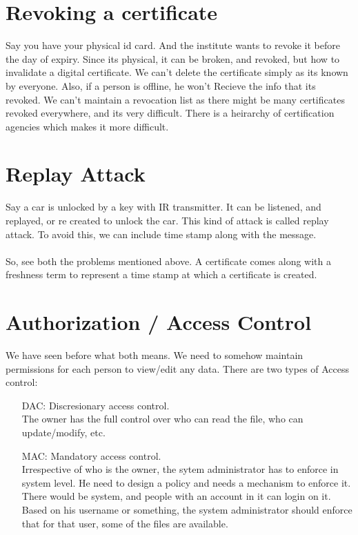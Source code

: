 \documentclass[english, 11pt]{article}
\begin{document}
\section*{Revoking a certificate}
Say you have your physical id card. And the institute wants to revoke it before the day of expiry. Since its physical, it can be broken, and revoked, but how to invalidate a digital certificate. We can't delete the certificate simply as its known by everyone. Also, if a person is offline, he won't Recieve the info that its revoked. We can't maintain a revocation list as there might be many certificates revoked everywhere, and its very difficult.
There is a heirarchy of certification agencies which makes it more difficult. 

\section*{Replay Attack}
Say a car is unlocked by a key with IR transmitter. It can be listened, and replayed, or re created to unlock the car. This kind of attack is called replay attack. To avoid this, we can include time stamp along with the message.
\\
\\
So, see both the problems mentioned above. A certificate comes along with a freshness term to represent a time stamp at which a certificate is created.

\section*{Authorization / Access Control}
We have seen before what both means. We need to somehow maintain permissions for each person to view/edit any data.
There are two types of Access control:
\begin{itemize}
  \item[DAC:] Discresionary access control.\\ The owner has the full control over who can read the file, who can update/modify, etc.
  \item[MAC:] Mandatory access control. \\ Irrespective of who is the owner, the sytem administrator has to enforce in system level. He need to design a policy and needs a mechanism to enforce it.
  There would be system, and people with an account in it can login on it. Based on his username or something, the system administrator should enforce that for that user, some of the files are available.
\end{itemize}
\end{document}
